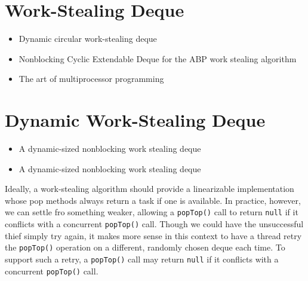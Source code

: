 

\section{Work-Stealing Deque}
\label{sec:queues-implementation-ws-deque}

\begin{itemize}
\item Dynamic circular work-stealing deque \cite{Chase2005}
\item Nonblocking Cyclic Extendable Deque for the ABP work stealing
  algorithm \cite{Lev2005}
\item The art of multiprocessor programming \cite{Herlihy2008}
\end{itemize}



\section{Dynamic Work-Stealing Deque}
\label{sec:queues-implementation-dynamic-ws-deque}

\begin{itemize}
\item A dynamic-sized nonblocking work stealing deque
  \cite{Hendler2006}
\item A dynamic-sized nonblocking work stealing deque
  \cite{Hendler2006a}
\end{itemize}


Ideally, a work-stealing algorithm should provide a linearizable
implementation whose pop methods always return a task if one is
available. In practice, however, we can settle fro something weaker,
allowing a \lstinline!popTop()! call to return \lstinline!null! if it
conflicts with a concurrent \lstinline!popTop()! call. Though we could
have the unsuccessful thief simply try again, it makes more sense in
this context to have a thread retry the \lstinline!popTop()! operation
on a different, randomly chosen deque each time. To support such a
retry, a \lstinline!popTop()! call may return \lstinline!null! if it
conflicts with a concurrent \lstinline!popTop()! call.




